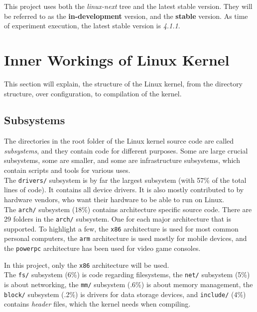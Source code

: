 \documentclass[a4paper,11pt]{report}
\newcommand{\figa}{
    \begin{figure}[!htpb]
    \centering
}
\newcommand{\figb}[2]{
    \caption{#1}
    \label{#2}
    \end{figure}
}
\begin{document}
This project uses both the \emph{linux-next} tree and the latest stable 
version. They will be referred to as the \textbf{in-development} 
version, and the \textbf{stable} version. As time of experiment execution, the 
latest stable version is \emph{4.1.1}.


    \section{Inner Workings of Linux Kernel}

This section will explain, the structure of the Linux kernel, from the 
directory structure, over configuration, to compilation of the kernel.


            \subsection{Subsystems}
            \label{sec:linuxss}

The directories in the root folder of the Linux kernel source code are called 
\emph{subsystems}, and they contain code for different purposes. Some are large 
crucial subsystems, some are smaller, and some are infrastructure 
subsystems, which contain scripts and tools for various uses\cite{42bugs}.
\\

The \texttt{drivers/} subsystem is by far the largest subsystem (with 57\% of 
the total lines of code). It contains all device drivers. It is also mostly 
contributed to by hardware vendors, who want their hardware to be able to run 
on Linux.
\\

The \texttt{arch/} subsystem (18\%) contains architecture specific source code. 
There are 29 folders in the \texttt{arch/} subsystem. One for each major 
architecture that is supported. To highlight a few, the \texttt{x86} 
architecture is used for most common personal computers, the \texttt{arm} 
architecture is used mostly for mobile devices, and the \texttt{powerpc} 
architecture has been used for video game consoles.

In this project, only the \texttt{x86} architecture will be used.
\\

The \texttt{fs/} subsystem (6\%) is code regarding filesystems, the 
\texttt{net/} subsystem (5\%) is about networking, the \texttt{mm/} 
subsystem (.6\%) is about memory management, the \texttt{block/} subsystem 
(.2\%) is drivers for data storage devices, and \texttt{include/} (4\%) 
contains \emph{header} files, which the kernel needs when 
compiling\cite{linuxorg}.
\\
\end{document}
